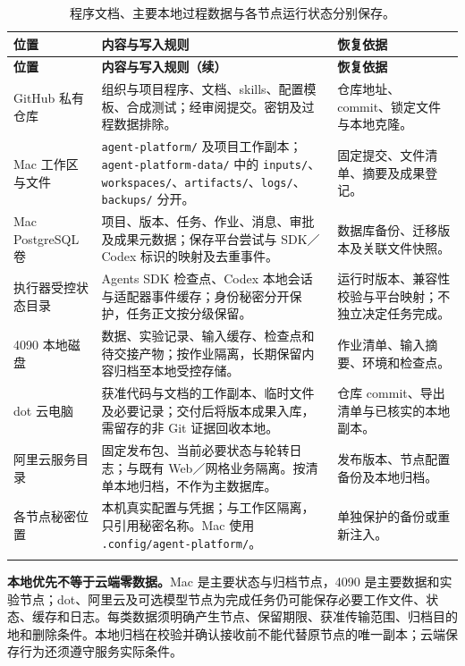 \documentclass[11pt,a4paper]{article}
\begin{document}
\begingroup\small\renewcommand{\arraystretch}{1.15}
\begin{longtable}{P{3.0cm}P{8.7cm}P{3.0cm}}
\toprule
\textbf{位置} & \textbf{内容与写入规则} & \textbf{恢复依据}\\
\midrule\endfirsthead
\toprule\textbf{位置} & \textbf{内容与写入规则（续）} & \textbf{恢复依据}\\\midrule\endhead
GitHub 私有仓库 & 组织与项目程序、文档、skills、配置模板、合成测试；经审阅提交。密钥及过程数据排除。 & 仓库地址、commit、锁定文件与本地克隆。\\
Mac 工作区与文件 & \texttt{agent-platform/} 及项目工作副本；\texttt{agent-platform-data/} 中的 \texttt{inputs/}、\allowbreak\texttt{workspaces/}、\allowbreak\texttt{artifacts/}、\allowbreak\texttt{logs/}、\allowbreak\texttt{backups/} 分开。 & 固定提交、文件清单、摘要及成果登记。\\
Mac PostgreSQL 卷 & 项目、版本、任务、作业、消息、审批及成果元数据；保存平台尝试与 SDK／Codex 标识的映射及去重事件。 & 数据库备份、迁移版本及关联文件快照。\\
执行器受控状态目录 & Agents SDK 检查点、Codex 本地会话与适配器事件缓存；身份秘密分开保护，任务正文按分级保留。 & 运行时版本、兼容性校验与平台映射；不独立决定任务完成。\\
4090 本地磁盘 & 数据、实验记录、输入缓存、检查点和待交接产物；按作业隔离，长期保留内容归档至本地受控存储。 & 作业清单、输入摘要、环境和检查点。\\
dot 云电脑 & 获准代码与文档的工作副本、临时文件及必要记录；交付后将版本成果入库，需留存的非 Git 证据回收本地。 & 仓库 commit、导出清单与已核实的本地副本。\\
阿里云服务目录 & 固定发布包、当前必要状态与轮转日志；与既有 Web／网格业务隔离。按清单本地归档，不作为主数据库。 & 发布版本、节点配置备份及本地归档。\\
各节点秘密位置 & 本机真实配置与凭据；与工作区隔离，只引用秘密名称。Mac 使用 \texttt{.config/agent-platform/}。 & 单独保护的备份或重新注入。\\
\bottomrule
\caption{程序文档、主要本地过程数据与各节点运行状态分别保存。}\\
\end{longtable}
\endgroup

\textbf{本地优先不等于云端零数据。}Mac 是主要状态与归档节点，4090 是主要数据和实验节点；dot、阿里云及可选模型节点为完成任务仍可能保存必要工作文件、状态、缓存和日志。每类数据须明确产生节点、保留期限、获准传输范围、归档目的地和删除条件。本地归档在校验并确认接收前不能代替原节点的唯一副本；云端保存行为还须遵守服务实际条件。
\end{document}
